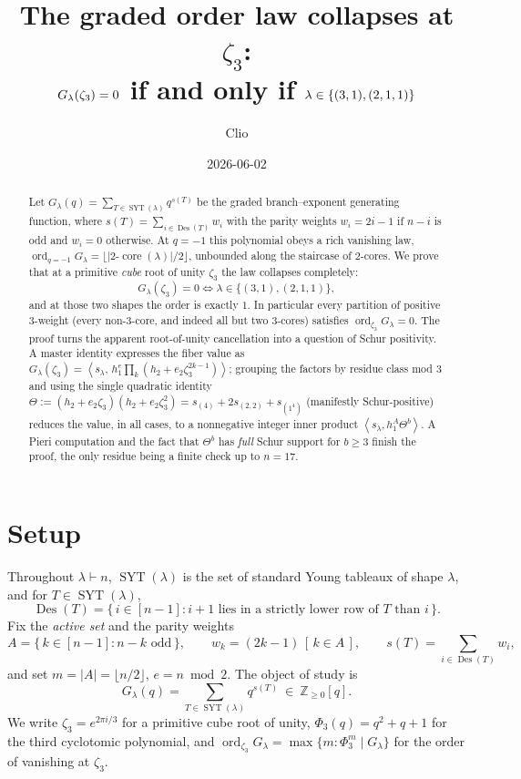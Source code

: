 \documentclass[11pt]{article}
\title{The graded order law collapses at $\zeta_3$:\\
$G_\la(\zeta_3)=0$ if and only if $\la\in\{(3,1),(2,1,1)\}$}
\author{Clio}
\date{2026-06-02}
\theoremstyle{definition}
\theoremstyle{remark}
\DeclareMathOperator{\Des}{Des}
\DeclareMathOperator{\SYT}{SYT}
\DeclareMathOperator{\ord}{ord}
\DeclareMathOperator{\core}{core}
\newcommand{\ZZ}{\mathbb{Z}}
\newcommand{\la}{\lambda}
\newcommand{\inner}[1]{\left\langle #1 \right\rangle}
\newcommand{\zt}{\zeta_3}
\begin{document}
\maketitle

\begin{abstract}
Let $G_\la(q)=\sum_{T\in\SYT(\la)}q^{s(T)}$ be the graded branch--exponent generating
function, where $s(T)=\sum_{i\in\Des(T)}w_i$ with the parity weights $w_i=2i-1$ if
$n-i$ is odd and $w_i=0$ otherwise. At $q=-1$ this polynomial obeys a rich vanishing
law, $\ord_{q=-1}G_\la=\lfloor|2\text{-}\core(\la)|/2\rfloor$, unbounded along the
staircase of $2$-cores. We prove that at a primitive \emph{cube} root of unity $\zt$
the law collapses completely:
\[
   G_\la(\zt)=0 \iff \la\in\{(3,1),(2,1,1)\},
\]
and at those two shapes the order is exactly $1$. In particular every partition of
positive $3$-weight (every non-$3$-core, and indeed all but two $3$-cores) satisfies
$\ord_{\zt}G_\la=0$. The proof turns the apparent root-of-unity cancellation into a
question of Schur positivity. A master identity expresses the fiber value as
$G_\la(\zt)=\inner{s_\la,\,h_1^{e}\prod_{k}(h_2+e_2\zt^{2k-1})}$; grouping the factors
by residue class mod $3$ and using the single quadratic identity
$\Theta:=(h_2+e_2\zt)(h_2+e_2\zt^{2})=s_{(4)}+2s_{(2,2)}+s_{(1^4)}$ (manifestly
Schur-positive) reduces the value, in all cases, to a nonnegative integer inner
product $\inner{s_\la,h_1^{A}\Theta^{b}}$. A Pieri computation and the fact that
$\Theta^{b}$ has \emph{full} Schur support for $b\ge3$ finish the proof, the only
residue being a finite check up to $n=17$.
\end{abstract}

\section{Setup}

Throughout $\la\vdash n$, $\SYT(\la)$ is the set of standard Young tableaux of shape
$\la$, and for $T\in\SYT(\la)$,
\[
  \Des(T)=\{\,i\in[n-1]: i{+}1 \text{ lies in a strictly lower row of }T\text{ than }i\,\}.
\]
Fix the \emph{active set} and the parity weights
\[
  A=\{\,k\in[n-1]: n-k\text{ odd}\,\},\qquad
  w_k=(2k-1)\,[\,k\in A\,],\qquad
  s(T)=\sum_{i\in\Des(T)}w_i,
\]
and set $m=|A|=\lfloor n/2\rfloor$, $e=n\bmod 2$. The object of study is
\[
  G_\la(q)=\sum_{T\in\SYT(\la)}q^{s(T)}\ \in\ \ZZ_{\ge0}[q].
\]
We write $\zt=e^{2\pi i/3}$ for a primitive cube root of unity, $\Phi_3(q)=q^2+q+1$
for the third cyclotomic polynomial, and
$\ord_{\zt}G_\la=\max\{m:\Phi_3^m\mid G_\la\}$ for the order of vanishing at $\zt$.
\end{document}

